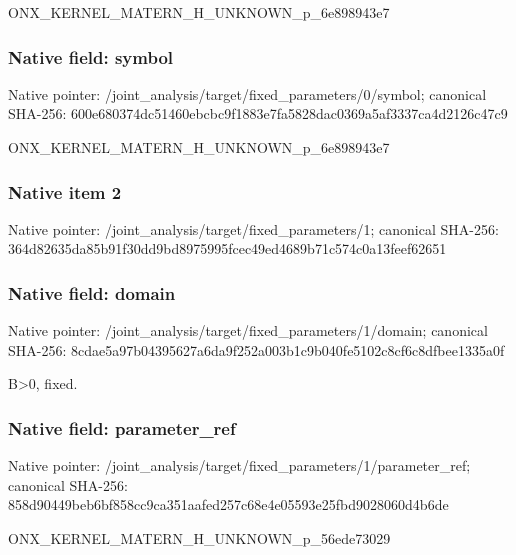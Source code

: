 \documentclass[10pt,a4paper]{article}
\begin{document}
\begingroup\raggedright\sloppy ONX\_\allowbreak{}KERNEL\_\allowbreak{}MATERN\_\allowbreak{}H\_\allowbreak{}UNKNOWN\_\allowbreak{}p\_\allowbreak{}6e898943e7\par\endgroup

\subsubsection{Native field: symbol}
Native pointer: /joint\_\allowbreak{}analysis/target/fixed\_\allowbreak{}parameters/0/symbol; canonical SHA-256: 600e680374dc51460ebcbc9f1883e7fa5828dac0369a5af3337ca4d2126c47c9

\begingroup\raggedright\sloppy ONX\_\allowbreak{}KERNEL\_\allowbreak{}MATERN\_\allowbreak{}H\_\allowbreak{}UNKNOWN\_\allowbreak{}p\_\allowbreak{}6e898943e7\par\endgroup

\subsubsection{Native item 2}
Native pointer: /joint\_\allowbreak{}analysis/target/fixed\_\allowbreak{}parameters/1; canonical SHA-256: 364d82635da85b91f30dd9bd8975995fcec49ed4689b71c574c0a13feef62651

\subsubsection{Native field: domain}
Native pointer: /joint\_\allowbreak{}analysis/target/fixed\_\allowbreak{}parameters/1/domain; canonical SHA-256: 8cdae5a97b04395627a6da9f252a003b1c9b040fe5102c8cf6c8dfbee1335a0f

\begingroup\raggedright\sloppy B>0,\allowbreak{} fixed.\par\endgroup

\subsubsection{Native field: parameter\_\allowbreak{}ref}
Native pointer: /joint\_\allowbreak{}analysis/target/fixed\_\allowbreak{}parameters/1/parameter\_\allowbreak{}ref; canonical SHA-256: 858d90449beb6bf858cc9ca351aafed257c68e4e05593e25fbd9028060d4b6de

\begingroup\raggedright\sloppy ONX\_\allowbreak{}KERNEL\_\allowbreak{}MATERN\_\allowbreak{}H\_\allowbreak{}UNKNOWN\_\allowbreak{}p\_\allowbreak{}56ede73029\par\endgroup
\end{document}
